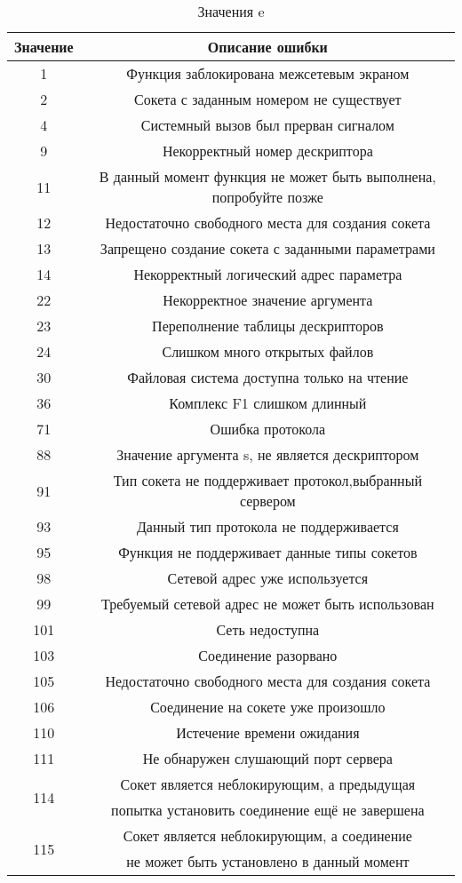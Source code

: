 \documentclass[12t,english,russian]{article}
\begin{document}
\newpage
\begin{center}
\begin{longtable}{|c|c|}
\caption{\label{error}Значения e}
\\ \hline
Значение & Описание ошибки \\
\hline
1 & Функция заблокирована межсетевым экраном\\
2 & Сокета с заданным номером не существует\\
4 & Системный вызов был прерван сигналом\\
9 & Некорректный номер дескриптора\\
11 & В данный момент функция не может быть выполнена, попробуйте позже\\
12 & Недостаточно свободного места для создания сокета \\
13 & Запрещено создание сокета с заданными параметрами \\
14 & Некорректный логический адрес параметра\\
22 & Некорректное значение аргумента\\
23 & Переполнение таблицы дескрипторов\\
24 & Слишком много открытых файлов\\
30 & Файловая система доступна только на чтение\\
36 & Комплекс F1 слишком длинный\\
71 & Ошибка протокола\\
88 & Значение аргумента s, не является дескриптором\\
91 & Тип сокета не поддерживает протокол,выбранный сервером\\
93 & Данный тип протокола не поддерживается\\
95 & Функция не поддерживает данные типы сокетов\\
98 & Сетевой адрес уже используется\\
99 & Требуемый сетевой адрес не может быть использован\\
101 & Сеть недоступна\\
103 & Соединение разорвано\\
105 & Недостаточно свободного места для создания сокета\\
106 & Соединение на сокете уже произошло\\
110 & Истечение времени ожидания\\
111 & Не обнаружен слушающий порт сервера\\
\multirow{2}{*}{114} & Сокет является неблокирующим, а предыдущая\\
& попытка установить соединение ещё не завершена\\
\multirow{2}{*}{115} & Сокет является неблокирующим, а соединение\\
& не может быть установлено в данный момент\\
\hline
\end{longtable}
\end{center}
\newpage
\end{document}
